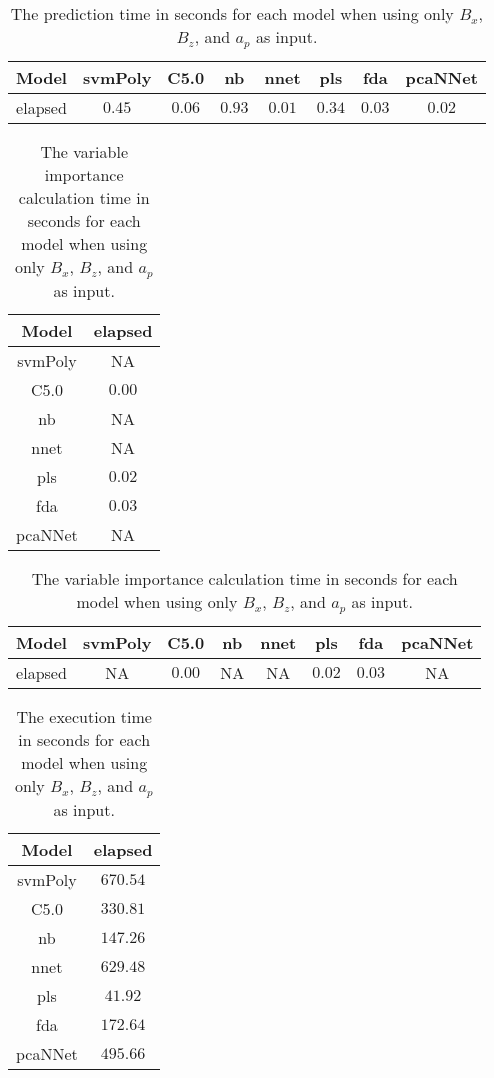 \begin{table}[!ht]
	\centering
	\begin{tabular}{|c|c|c|c|c|c|c|c|}
		\hline
		Model & svmPoly & C5.0 & nb & nnet & pls & fda & pcaNNet \\ \hline
		elapsed & $0.45$ & $0.06$ & $0.93$ & $0.01$ & $0.34$ & $0.03$ & $0.02$ \\ \hline
	\end{tabular}
	\caption{The prediction time in seconds for each model when using only $B_{x}$, $B_{z}$, and $a_{p}$ as input.}
	\label{tab:time:reverse:xzap:predict}
\end{table}

\begin{table}[!ht]
	\centering
	\begin{tabular}{|c|c|}
		\hline
		Model & elapsed \\ \hline
		svmPoly & NA \\ \hline
		C5.0 & $0.00$ \\ \hline
		nb & NA \\ \hline
		nnet & NA \\ \hline
		pls & $0.02$ \\ \hline
		fda & $0.03$ \\ \hline
		pcaNNet & NA \\ \hline
	\end{tabular}
	\caption{The variable importance calculation time in seconds for each model when using only $B_{x}$, $B_{z}$, and $a_{p}$ as input.}
	\label{tab:time:xzap:importance}
\end{table}

\begin{table}[!ht]
	\centering
	\begin{tabular}{|c|c|c|c|c|c|c|c|}
		\hline
		Model & svmPoly & C5.0 & nb & nnet & pls & fda & pcaNNet \\ \hline
		elapsed & NA & $0.00$ & NA & NA & $0.02$ & $0.03$ & NA \\ \hline
	\end{tabular}
	\caption{The variable importance calculation time in seconds for each model when using only $B_{x}$, $B_{z}$, and $a_{p}$ as input.}
	\label{tab:time:reverse:xzap:importance}
\end{table}

\begin{table}[!ht]
	\centering
	\begin{tabular}{|c|c|}
		\hline
		Model & elapsed \\ \hline
		svmPoly & $670.54$ \\ \hline
		C5.0 & $330.81$ \\ \hline
		nb & $147.26$ \\ \hline
		nnet & $629.48$ \\ \hline
		pls & $41.92$ \\ \hline
		fda & $172.64$ \\ \hline
		pcaNNet & $495.66$ \\ \hline
	\end{tabular}
	\caption{The execution time in seconds for each model when using only $B_{x}$, $B_{z}$, and $a_{p}$ as input.}
	\label{tab:time:xzap:total}
\end{table}

